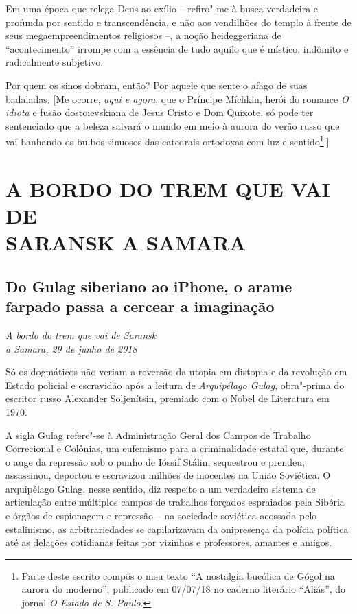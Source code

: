 Em uma época que relega Deus ao exílio -- refiro"-me à busca verdadeira e
profunda por sentido e transcendência, e não aos vendilhões do templo à
frente de seus megaempreendimentos religiosos --, a noção heideggeriana
de ``acontecimento'' irrompe com a essência de tudo aquilo que é
místico, indômito e radicalmente subjetivo.

Por quem os sinos dobram, então? Por aquele que sente o afago de suas
badaladas. {[}Me ocorre, \emph{aqui e agora}, que o Príncipe Míchkin,
herói do romance \emph{O idiota} e fusão dostoievskiana de Jesus Cristo
e Dom Quixote, só pode ter sentenciado que a beleza salvará o mundo em
meio à aurora do verão russo que vai banhando os bulbos sinuosos das
catedrais ortodoxas com luz e sentido\footnote{Parte deste escrito
  compôs o meu texto ``A nostalgia bucólica de Gógol na aurora do
  moderno'', publicado em 07/07/18 no caderno literário ``Aliás'', do
  jornal \emph{O Estado de S. Paulo}.}.{]}

\clearpage{\pagestyle{empty}\cleardoublepage}
\movetooddpage
{}
\part*{A BORDO DO TREM QUE VAI DE\\SARANSK A SAMARA}

\chapter*{Do Gulag siberiano ao iPhone, o arame farpado passa a cercear a imaginação}

\begin{flushright}
\emph{A bordo do trem que vai de Saransk\\a Samara, 29 de junho de 2018}
\end{flushright}

Só os dogmáticos não veriam a reversão da utopia em distopia e da
revolução em Estado policial e escravidão após a leitura de
\emph{Arquipélago Gulag}, obra"-prima do escritor russo Alexander
Soljenítsin, premiado com o Nobel de Literatura em 1970.

A sigla Gulag refere"-se à Administração Geral dos Campos de Trabalho
Correcional e Colônias, um eufemismo para a criminalidade estatal que,
durante o auge da repressão sob o punho de Ióssif Stálin, sequestrou e
prendeu, assassinou, deportou e escravizou milhões de inocentes na União
Soviética. O arquipélago Gulag, nesse sentido, diz respeito a um
verdadeiro sistema de articulação entre múltiplos campos de trabalhos
forçados espraiados pela Sibéria e órgãos de espionagem e repressão --
na sociedade soviética acossada pelo estalinismo, as arbitrariedades se
capilarizavam da onipresença da polícia política até as delações
cotidianas feitas por vizinhos e professores, amantes e amigos.

